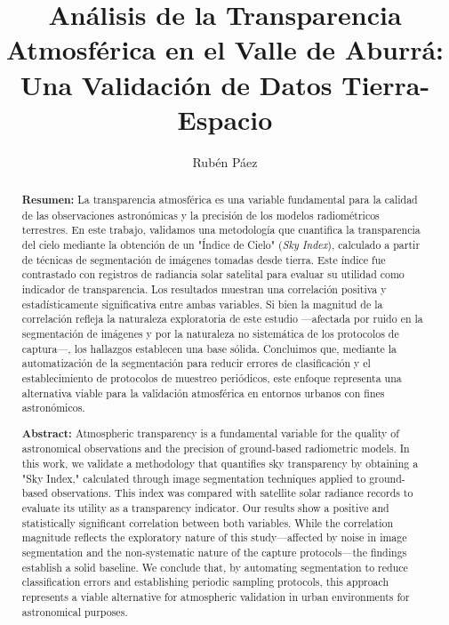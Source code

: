 \documentclass[twocolumn]{aastex701}
\begin{document}
\title{Análisis de la Transparencia Atmosférica en el Valle de Aburrá: Una Validación de Datos Tierra-Espacio}

\author[0000-0000-0000-0000]{Rubén Páez}

\begin{abstract}
    \textbf{Resumen:} La transparencia atmosférica es una variable fundamental para la calidad de las observaciones astronómicas y la precisión de los modelos radiométricos terrestres. En este trabajo, validamos una metodología que cuantifica la transparencia del cielo mediante la obtención de un "Índice de Cielo" (\textit{Sky Index}), calculado a partir de técnicas de segmentación de imágenes tomadas desde tierra. Este índice fue contrastado con registros de radiancia solar satelital para evaluar su utilidad como indicador de transparencia. Los resultados muestran una correlación positiva y estadísticamente significativa entre ambas variables. Si bien la magnitud de la correlación refleja la naturaleza exploratoria de este estudio —afectada por ruido en la segmentación de imágenes y por la naturaleza no sistemática de los protocolos de captura—, los hallazgos establecen una base sólida. Concluimos que, mediante la automatización de la segmentación para reducir errores de clasificación y el establecimiento de protocolos de muestreo periódicos, este enfoque representa una alternativa viable para la validación atmosférica en entornos urbanos con fines astronómicos.
    
    \vspace{0.3cm}
    
    \textbf{Abstract:} Atmospheric transparency is a fundamental variable for the quality of astronomical observations and the precision of ground-based radiometric models. In this work, we validate a methodology that quantifies sky transparency by obtaining a "Sky Index," calculated through image segmentation techniques applied to ground-based observations. This index was compared with satellite solar radiance records to evaluate its utility as a transparency indicator. Our results show a positive and statistically significant correlation between both variables. While the correlation magnitude reflects the exploratory nature of this study—affected by noise in image segmentation and the non-systematic nature of the capture protocols—the findings establish a solid baseline. We conclude that, by automating segmentation to reduce classification errors and establishing periodic sampling protocols, this approach represents a viable alternative for atmospheric validation in urban environments for astronomical purposes.
    \end{abstract}
\end{document}
